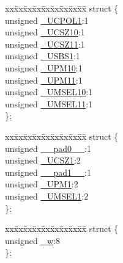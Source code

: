 \begin{DoxyCompactItemize}
\item 
\begin{tabbing}
xx\=xx\=xx\=xx\=xx\=xx\=xx\=xx\=xx\=\kill
struct \{\\
\>unsigned \hyperlink{union_____u_c_s_r1_cbits__t_ac7265c8336dde1215cb9537bf4bd2549}{\_UCPOL1}:1\\
\>unsigned \hyperlink{union_____u_c_s_r1_cbits__t_a093efd44f39a643b5dfed152957cbcae}{\_UCSZ10}:1\\
\>unsigned \hyperlink{union_____u_c_s_r1_cbits__t_a81f88dab4a5b2f43292fe3e5f0aaf358}{\_UCSZ11}:1\\
\>unsigned \hyperlink{union_____u_c_s_r1_cbits__t_a1593db7efc37eb437532412bb7919a25}{\_USBS1}:1\\
\>unsigned \hyperlink{union_____u_c_s_r1_cbits__t_a10bba9312940dc261cd64e42a7f3d4ee}{\_UPM10}:1\\
\>unsigned \hyperlink{union_____u_c_s_r1_cbits__t_a257750ea1eb4c2d0e3da9a5bfad866d0}{\_UPM11}:1\\
\>unsigned \hyperlink{union_____u_c_s_r1_cbits__t_a25a222d46ecc7bfdf05c7d261eccae07}{\_UMSEL10}:1\\
\>unsigned \hyperlink{union_____u_c_s_r1_cbits__t_af72a2583fe7a1b2f0de729ed1d5147ec}{\_UMSEL11}:1\\
\}; \\

\end{tabbing}\item 
\begin{tabbing}
xx\=xx\=xx\=xx\=xx\=xx\=xx\=xx\=xx\=\kill
struct \{\\
\>unsigned \hyperlink{union_____u_c_s_r1_cbits__t_aaa78efb82f1a89bf90227dbb14caff89}{\_\_pad0\_\_}:1\\
\>unsigned \hyperlink{union_____u_c_s_r1_cbits__t_a1b9edbb5dd9377d594d7d8c86bd64590}{\_UCSZ1}:2\\
\>unsigned \hyperlink{union_____u_c_s_r1_cbits__t_a52c5209bf64b32709b206152354480af}{\_\_pad1\_\_}:1\\
\>unsigned \hyperlink{union_____u_c_s_r1_cbits__t_a8cd017a636f44888a0c77191f12c88f8}{\_UPM1}:2\\
\>unsigned \hyperlink{union_____u_c_s_r1_cbits__t_a3a11e7d8edd576d199fbee42fdd4f622}{\_UMSEL1}:2\\
\}; \\

\end{tabbing}\item 
\begin{tabbing}
xx\=xx\=xx\=xx\=xx\=xx\=xx\=xx\=xx\=\kill
struct \{\\
\>unsigned \hyperlink{union_____u_c_s_r1_cbits__t_a17c7499f606cabec5ba1713d7de53833}{\_w}:8\\
\}; \\

\end{tabbing}\end{DoxyCompactItemize}



